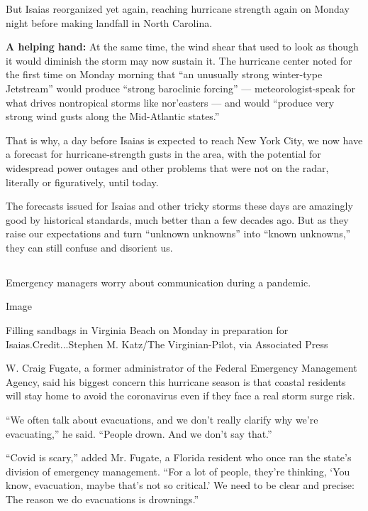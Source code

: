 But Isaias reorganized yet again, reaching hurricane strength again on
Monday night before making landfall in North Carolina.

\textbf{A helping hand:} At the same time, the wind shear that used to
look as though it would diminish the storm may now sustain it. The
hurricane center noted for the first time on Monday morning that ``an
unusually strong winter-type Jetstream'' would produce ``strong
baroclinic forcing'' --- meteorologist-speak for what drives nontropical
storms like nor'easters --- and would ``produce very strong wind gusts
along the Mid-Atlantic states.''

That is why, a day before Isaias is expected to reach New York City, we
now have a forecast for hurricane-strength gusts in the area, with the
potential for widespread power outages and other problems that were not
on the radar, literally or figuratively, until today.

The forecasts issued for Isaias and other tricky storms these days are
amazingly good by historical standards, much better than a few decades
ago. But as they raise our expectations and turn ``unknown unknowns''
into ``known unknowns,'' they can still confuse and disorient us.

\hypertarget{-3}{%
\subsection{}\label{-3}}

Emergency managers worry about communication during a pandemic.

Image

Filling sandbags in Virginia Beach on Monday in preparation for
Isaias.Credit...Stephen M. Katz/The Virginian-Pilot, via Associated
Press

W. Craig Fugate, a former administrator of the Federal Emergency
Management Agency, said his biggest concern this hurricane season is
that coastal residents will stay home to avoid the coronavirus even if
they face a real storm surge risk.

``We often talk about evacuations, and we don't really clarify why we're
evacuating,'' he said. ``People drown. And we don't say that.''

``Covid is scary,'' added Mr. Fugate, a Florida resident who once ran
the state's division of emergency management. ``For a lot of people,
they're thinking, `You know, evacuation, maybe that's not so critical.'
We need to be clear and precise: The reason we do evacuations is
drownings.''


